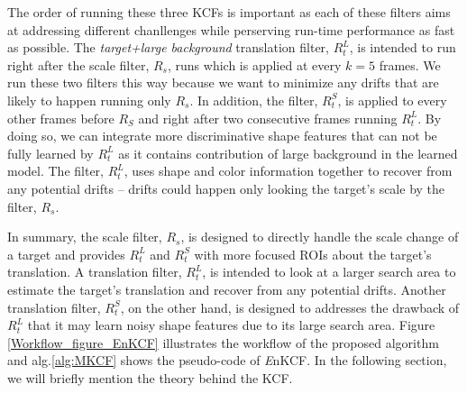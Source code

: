\documentclass{bmvc2k}
\begin{document}
The order of running these three KCFs is important as each of these
filters aims at addressing different chanllenges while perserving
run-time performance as fast as possible. The \textit{target+large
  background} translation filter, $R_{t}^{L}$, is intended to run
right after the scale filter, $R_s$, runs which is applied at every
$k=5$ frames. We run these two filters this way because we want to
minimize any drifts that are likely to happen running only $R_{s}$. In
addition, the filter, $R_{t}^{S}$, is applied to every other frames
before $R_{S}$ and right after two consecutive frames running
$R_{t}^{L}$. By doing so, we can integrate more discriminative shape
features that can not be fully learned by $R_{t}^{L}$ as it contains
contribution of large background in the learned model. The filter,
$R_{t}^{L}$, uses shape and color information together to recover from
any potential drifts -- drifts could happen only looking the target's
scale by the filter, $R_{s}$.

In summary, the scale filter, $R_{s}$, is designed to directly handle
the scale change of a target and provides $R_{t}^{L}$ and $R_{t}^{S}$
with more focused ROIs about the target's translation. A translation
filter, $R_{t}^{L}$, is intended to look at a larger search area to
estimate the target's translation and recover from any potential
drifts. Another translation filter, $R_{t}^{S}$, on the other hand, is
designed to addresses the drawback of $R_{t}^{L}$ that it may learn
noisy shape features due to its large search area. Figure
\ref{Workflow_figure_EnKCF} illustrates the workflow of the proposed
algorithm and alg.\ref{alg:MKCF} shows the pseudo-code of {\it
  E}nKCF. In the following section, we will briefly mention the theory
behind the KCF.
\end{document}
